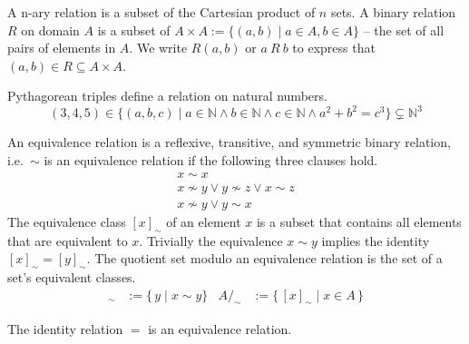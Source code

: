

\begin{definition}
	A n-ary relation is a subset of the Cartesian product of $n$ sets.
	A {\myem binary relation} $R$ on domain $A$ 
	is a subset of $A \times A := \{ (a,b) \mid a\in A, b\in A \}$ -- 
	the set of all pairs of elements in $A$.
	We write $R(a,b)$ or $a\ R\ b$ to express that $(a,b)\in R \subseteq A\times A$.
\end{definition}

\begin{example}
	Pythagorean triples define a relation on natural numbers. 
	\[(3,4,5)\in\{ 
		(a,b,c) \mid 
		a\in\mathbb{N}\land 
		b\in\mathbb{N}\land 
		c\in\mathbb{N}\land
		a^2 + b^2 = c^3
	\}
	\subsetneq \mathbb{N}^3
	\] 
\end{example}

\begin{definition}
	An {\myem equivalence relation} 
	is a reflexive, transitive, and symmetric binary relation, 
	i.e.~$\sim$ is an equivalence relation if the following three clauses hold.
	\begin{align*}
	x\sim x
	\tag*{reflexivivity}
	\\
	x\not\sim y \lor  y \not\sim z \lor x\sim z
	\tag*{transitivity}
	\\
	x\not\sim y \lor y\sim x
	\tag*{symmetry}
	\end{align*}
	The {\myem equivalence class} $[x]_\sim$
	of an element $x$ is a subset that contains all elements that are equivalent to $x$.
	Trivially the equivalence $x\sim y$ implies the identity $[x]_\sim = [y]_\sim$.
	The quotient set modulo an equivalence relation is the set of a set's equivalent classes.
	\begin{align*} 
	[x]_\sim &:= \{\, y \mid x \sim y\} &
	A/_{\!\sim} &:= \{\, [x]_\sim \mid x \in A \,\} 
	\end{align*} 
\end{definition}

\begin{lemma}
	The identity relation $=$ is an equivalence relation.
\end{lemma}

